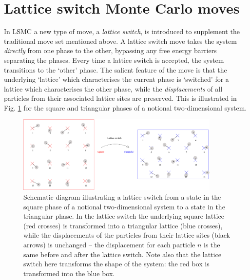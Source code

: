 \documentclass{report}
\begin{document}
\section{Lattice switch Monte Carlo moves}\label{sec:lattice_switch}
In LSMC a new type of move, a \emph{lattice switch}, is introduced to supplement the traditional move set mentioned above. A lattice switch move takes
the system \emph{directly} from one phase to the other, bypassing any free energy barriers separating the phases. Every time a lattice switch is accepted, 
the system transitions to the `other' phase. The salient feature of the move is that the underlying `lattice' which characterises the current phase is 
`switched' for a lattice which characterises the other phase, while the \emph{displacements} of all particles from their associated lattice sites are
preserved. This is illustrated in Fig. \ref{fig:switch_diagram} for the square and triangular phases of a notional two-dimensional system.

\begin{figure}
\centering
\includegraphics[width=0.9\textwidth]{switch_diagram}
\caption
{Schematic diagram illustrating a lattice switch from a state in the square phase of a notional two-dimensional system to a state in the triangular phase. 
In the lattice switch the underlying square lattice (red crosses) is transformed into a triangular lattice (blue crosses), while the displacements of 
the particles from their lattice sites (black arrows) is unchanged -- the displacement for each particle $n$ is the same before and after the lattice 
switch. Note also that the lattice switch here transforms the shape of the system: the red box is transformed into the blue box.}
\label{fig:switch_diagram}
\end{figure}
\end{document}
